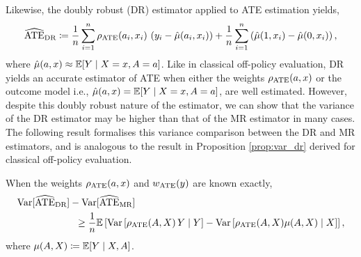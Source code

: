 Likewise, the doubly robust (DR) estimator applied to ATE estimation yields,
\begin{align*}
    \widehat{\textup{ATE}}_{\textup{DR}} \coloneqq \frac{1}{n} \sum_{i=1}^n \rho_{\textup{ATE}}(a_i, x_i)\,\left(y_i - \hat{\mu}(a_i, x_i)\right) + \frac{1}{n} \sum_{i=1}^n \left( \hat{\mu}(1, x_i)-  \hat{\mu}(0, x_i)\right),
\end{align*}
where $\hat{\mu}(a, x)\approx \mathbb{E}[Y\mid X=x, A=a]$. 
Like in classical off-policy evaluation, DR yields an accurate estimator of ATE when either the weights $\rho_{\textup{ATE}}(a, x)$ or the outcome model i.e., $\hat{\mu}(a, x) = \mathbb{E}[Y\mid X=x, A=a]$, are well estimated.
However, despite this doubly robust nature of the estimator, we can show that the variance of the DR estimator may be higher than that of the MR estimator in many cases. The following result formalises this variance comparison between the DR and MR estimators, and is analogous to the result in Proposition \ref{prop:var_dr} derived for classical off-policy evaluation. 
\begin{proposition}\label{prop:ate_var_dr}
    When the weights $\rho_{\textup{ATE}}(a, x)$ and $w_{\textup{ATE}}(y)$ are known exactly,
    \begin{align*}
    &\textup{Var}[\widehat{\textup{ATE}}_{\textup{DR}}] - \textup{Var}[\widehat{\textup{ATE}}_{\textup{MR}}]\\
    &\qquad \qquad \qquad \geq \frac{1}{n}\mathbb{E} \left[ \textup{Var}\left[ \rho_{\textup{ATE}}(A, X)\,Y \mid Y \right] -  \textup{Var}\left[ \rho_{\textup{ATE}}(A, X)\mu(A, X) \mid X \right] \right],
\end{align*}
where $\mu(A, X) \coloneqq \mathbb{E}[Y\mid X, A]$.
\end{proposition}

